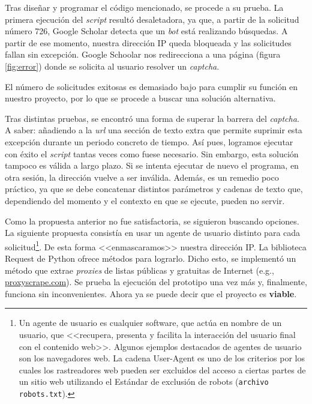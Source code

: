 
Tras diseñar y programar el código mencionado, se procede a su prueba. La primera ejecución del \textit{script} resultó desaletadora, ya que, a partir de la solicitud número 726, Google Scholar detecta que un \textit{bot} está realizando búsquedas. A partir de ese momento, nuestra dirección IP queda bloqueada y las solicitudes fallan sin excepción. Google Schoolar nos redirecciona a una página (figura \ref{fig:error}) donde se solicita al usuario resolver un \textit{captcha}. 


El número de solicitudes exitosas es demasiado bajo para cumplir su función en nuestro proyecto, por lo que se procede a buscar una solución alternativa. 

Tras distintas pruebas, se encontró una forma de superar la barrera del \textit{captcha}. A saber: añadiendo a la \textit{url} una sección de texto extra que permite suprimir esta excepción durante un periodo concreto de tiempo. Así pues, logramos ejecutar con éxito el \textit{script} tantas veces como fuese necesario. Sin embargo, esta solución tampoco es válida a largo plazo. Si se intenta ejecutar de nuevo el programa, en otra sesión, la dirección vuelve a ser inválida. Además, es un remedio poco práctico, ya que se debe concatenar distintos parámetros y cadenas de texto que, dependiendo del momento y el contexto en que se ejecute, pueden no servir.

Como la propuesta anterior no fue satisfactoria, se siguieron buscando opciones. La siguiente propuesta consistía en usar un agente de usuario distinto para cada solicitud\footnote{Un agente de usuario es cualquier software, que actúa en nombre de un usuario, que <<recupera, presenta y facilita la interacción del usuario final con el contenido web>>. Algunos ejemplos destacados de agentes de usuario son los navegadores web. La cadena User-Agent es uno de los criterios por los cuales los rastreadores web pueden ser excluidos del acceso a ciertas partes de un sitio web utilizando el Estándar de exclusión de robots (\texttt{archivo robots.txt}).}. De esta forma <<enmascaramos>> nuestra dirección IP. La biblioteca Request de Python ofrece métodos para lograrlo. Dicho esto, se implementó un método que extrae \textit{proxies} de listas públicas y gratuitas de Internet (e.g., \href{https://www.proxyscrape.com/free-proxy-list}{proxyscrape.com}). Se prueba la ejecución del prototipo una vez más y, finalmente, funciona sin inconvenientes. Ahora ya se puede decir que el proyecto es \textbf{viable}.


